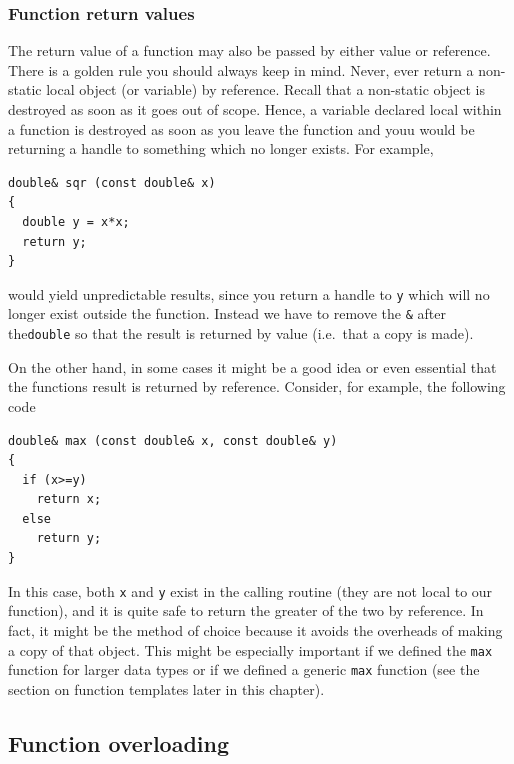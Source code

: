 \subsubsection{Function return values}

The return value of a function may also be passed by either value or reference.
There is a golden rule you should always keep in mind. Never, ever return a
non-static local object (or variable) by reference. Recall that a non-static object
is destroyed as soon as it goes out of scope. Hence, a variable declared local
within a function is destroyed as soon as you leave the function and youu would
be returning a handle to something which no longer exists. For example,
{\small \begin{verbatim}
double& sqr (const double& x)
{
  double y = x*x;
  return y;
}
\end{verbatim}}
\noindent
would yield unpredictable results, since you return a handle to \verb+y+ which
will no longer exist outside the function. Instead we have to remove the \verb+&+
after the\verb+double+ so that the result is returned by value (i.e.\ that a copy is
made).

On the other hand, in some cases it might be a good idea or even essential that the
functions result is returned by reference. Consider, for example, the following
code
{\small \begin{verbatim}
double& max (const double& x, const double& y)
{
  if (x>=y)
    return x;
  else
    return y;
}
\end{verbatim}}
\noindent
In this case, both \verb+x+ and \verb+y+ exist in the calling routine (they are not
local to our function), and it is quite safe to return the greater of the two by
reference. In fact, it might be the method of choice because it avoids the overheads
of making a copy of that object. This might be especially important if we defined the
\verb+max+ function for larger data types or if we defined a generic \verb+max+
function (see the section on function templates later in this chapter).


\subsection{Function overloading}


